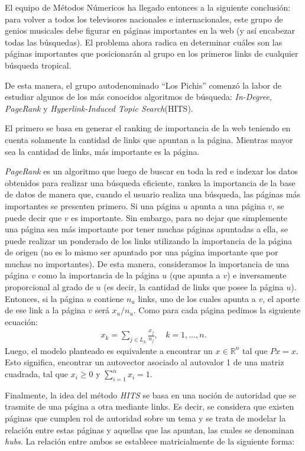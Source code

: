 El equipo de Métodos Númericos ha llegado entonces a la siguiente conclusión:  para volver a todos los televisores nacionales e internacionales, este grupo de genios musicales debe figurar en páginas importantes en la web (y así encabezar todas las búsquedas). El problema ahora radica en determinar cuáles son las páginas importantes que posicionarán al grupo en los primeros links de cualquier búsqueda tropical. 

De esta manera, el grupo autodenominado ``Los Pichis'' comenzó la labor de estudiar algunos de los más conocidos algoritmos de búsqueda: \textit{In-Degree}, \textit{PageRank} y \textit{Hyperlink-Induced Topic Search}(HITS).

El primero se basa en generar el ranking de importancia de la web teniendo en cuenta solamente la cantidad de links que apuntan a la página. Mientras mayor sea la cantidad de links, más importante es la página. 

\textit{PageRank} es un algoritmo que luego de buscar en toda la red e indexar los datos obtenidos para realizar una búsqueda eficiente, rankea la importancia de la base de datos de manera que, cuando el usuario realiza una búsqueda, las páginas más importantes se presenten primero. Si una página $u$ apunta a una página $v$, se puede decir que $v$ es importante. Sin embargo, para no dejar que simplemente una página sea más importante por tener muchas páginas apuntadas a ella, se puede realizar un ponderado de los links utilizando la importancia de la página de origen (no es lo mismo ser apuntado por una página importante que por muchas no importantes). De esta manera, consideramos la importancia de una página $v$ como la importancia de la página $u$ (que apunta a $v$) e inversamente proporcional al grado de $u$ (es decir, la cantidad de links que  posee la página $u$). Entonces, si la página $u$ contiene $n_u$ links, uno de los cuales apunta a $v$, el aporte de ese link a la página $v$ será $x_u / n_u$.
Como para cada página pedimos la siguiente ecuación: 
\begin{eqnarray}
x_k = \sum_{j \in L_k} \frac{x_j}{n_j},~~~~k = 1,\dots,n. \label{eq:basicmodel}
\end{eqnarray}
Luego, el modelo planteado es equivalente a encontrar un $x\in \mathbb{R}^n$ tal que $Px = x$. Esto significa, encontrar un autovector asociado al autovalor 1 de una matriz cuadrada, tal que $x_i \ge
0$ y $\sum_{i = 1}^n x_i = 1$.
\par 
Finalmente, la idea del método \textit{HITS} se basa en una noción de autoridad que se trasmite de una página a otra mediante links. Es decir, se considera que existen páginas que cumplen rol de autoridad sobre un tema y se trata de modelar la relación entre estas páginas y aquellas que las apuntan, las cuales se denominan \textit{hubs}. 
La relación entre ambos se establece matricialmente de la siguiente forma: 


